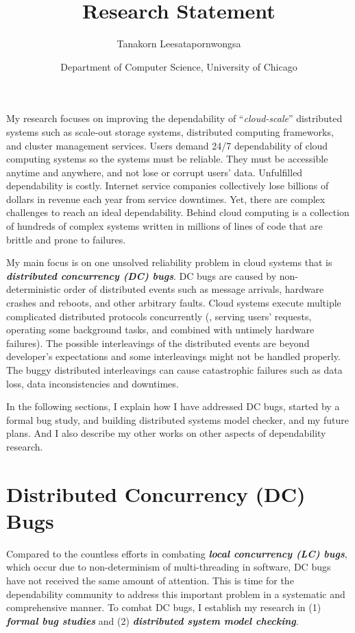 \documentclass[11pt]{article}
\begin{document}
\title{Research Statement}
\author{Tanakorn Leesatapornwongsa}
\date{\vspace{-1ex} \small{Department of Computer Science, University of
Chicago}}

\maketitle

My research focuses on improving the dependability of ``\textit{cloud-scale}''
distributed systems such as scale-out storage systems, distributed computing
frameworks, and cluster management services. Users demand 24/7 dependability of
cloud computing systems so the systems must be reliable. They must be
accessible anytime and anywhere, and not lose or corrupt users' data.
Unfulfilled dependability is costly. Internet service companies collectively
lose billions of dollars in revenue each year from service downtimes. Yet,
there are complex challenges to reach an ideal dependability. Behind cloud
computing is a collection of hundreds of complex systems written in millions of
lines of code that are brittle and prone to failures.

My main focus is on one unsolved reliability problem in cloud systems that is
\textbf{\textit{distributed concurrency (DC) bugs}}. DC bugs are caused by
non-deterministic order of distributed events such as message arrivals, hardware
crashes and reboots, and other arbitrary faults. Cloud systems execute multiple
complicated distributed protocols concurrently (\eg, serving users' requests,
operating some background tasks, and combined with untimely hardware failures).
The possible interleavings of the distributed events are beyond developer's
expectations and some interleavings might not be handled properly.  The buggy
distributed interleavings can cause catastrophic failures such as data loss,
data inconsistencies and downtimes.

In the following sections, I explain how I have addressed DC bugs, started by a
formal bug study, and building distributed systems model checker, and my future
plans. And I also describe my other works on other aspects of dependability
research.

\section{Distributed Concurrency (DC) Bugs}\label{dcbugs}

Compared to the countless efforts in combating \textbf{\textit{local concurrency
(LC) bugs}}, which occur due to non-determinism of multi-threading in software,
DC bugs have not received the same amount of attention. This is time for the
dependability community to address this important problem in a systematic and
comprehensive manner. To combat DC bugs, I establish my research in (1)
\textbf{\textit{formal bug studies}} and (2) \textbf{\textit{distributed system
model checking}}. 
\end{document}
